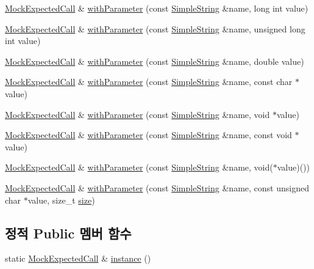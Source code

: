 \begin{DoxyCompactItemize}
\item 
\hyperlink{class_mock_expected_call}{Mock\+Expected\+Call} \& \hyperlink{class_mock_expected_call_a0c84c6e3e39eef70254a71e4b7e275f8}{with\+Parameter} (const \hyperlink{class_simple_string}{Simple\+String} \&name, long int value)
\item 
\hyperlink{class_mock_expected_call}{Mock\+Expected\+Call} \& \hyperlink{class_mock_expected_call_adf4fe75932c7d2ce5f6ca5b4a8bece96}{with\+Parameter} (const \hyperlink{class_simple_string}{Simple\+String} \&name, unsigned long int value)
\item 
\hyperlink{class_mock_expected_call}{Mock\+Expected\+Call} \& \hyperlink{class_mock_expected_call_ab554906346659e0f70f7764ed1fd3f28}{with\+Parameter} (const \hyperlink{class_simple_string}{Simple\+String} \&name, double value)
\item 
\hyperlink{class_mock_expected_call}{Mock\+Expected\+Call} \& \hyperlink{class_mock_expected_call_ac5f6920554d1ecc0a9bbf417d5c69375}{with\+Parameter} (const \hyperlink{class_simple_string}{Simple\+String} \&name, const char $\ast$value)
\item 
\hyperlink{class_mock_expected_call}{Mock\+Expected\+Call} \& \hyperlink{class_mock_expected_call_abb0ab5ac7408454bb144beaa438030ac}{with\+Parameter} (const \hyperlink{class_simple_string}{Simple\+String} \&name, void $\ast$value)
\item 
\hyperlink{class_mock_expected_call}{Mock\+Expected\+Call} \& \hyperlink{class_mock_expected_call_a21e7495ae9bfea1385978133b6a732ec}{with\+Parameter} (const \hyperlink{class_simple_string}{Simple\+String} \&name, const void $\ast$value)
\item 
\hyperlink{class_mock_expected_call}{Mock\+Expected\+Call} \& \hyperlink{class_mock_expected_call_aba33fa78bdbe902780310feeea1be85c}{with\+Parameter} (const \hyperlink{class_simple_string}{Simple\+String} \&name, void($\ast$value)())
\item 
\hyperlink{class_mock_expected_call}{Mock\+Expected\+Call} \& \hyperlink{class_mock_expected_call_ad4aa71d2fe21ec752c8d66491038001b}{with\+Parameter} (const \hyperlink{class_simple_string}{Simple\+String} \&name, const unsigned char $\ast$value, size\+\_\+t \hyperlink{gst__avb__playbin_8c_a439227feff9d7f55384e8780cfc2eb82}{size})
\end{DoxyCompactItemize}
\subsection*{정적 Public 멤버 함수}
\begin{DoxyCompactItemize}
\item 
static \hyperlink{class_mock_expected_call}{Mock\+Expected\+Call} \& \hyperlink{class_mock_ignored_expected_call_ad78f4e7eaedd5d8d98e7e2eeda79c8c8}{instance} ()
\end{DoxyCompactItemize}


